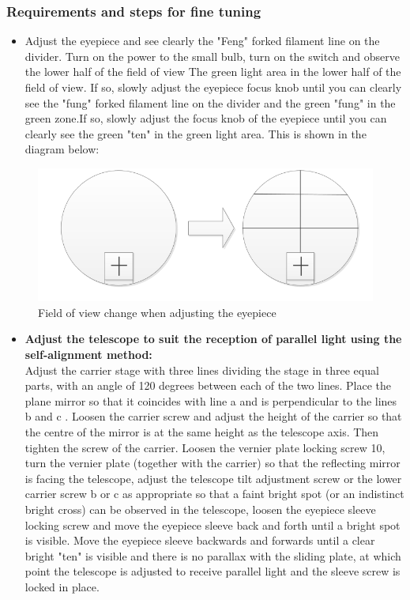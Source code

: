 \documentclass[UTF8]{article}
\begin{document}
    \subsubsection{Requirements and steps for fine tuning}
     \begin{itemize}
                 \item Adjust the eyepiece and see clearly the "Feng" forked filament line on the divider. Turn on the power to the small bulb, turn on the switch and observe the lower half of the field of view The green light area in the lower half of the field of view. If so, slowly adjust the eyepiece focus knob until you can clearly see the "fung" forked filament line on the divider and the green "fung" in the green zone.If so, slowly adjust the focus knob of the eyepiece until you can clearly see the green "ten" in the green light area. This is shown in the diagram below:
    \end{itemize}
     \begin{figure}[H]
         	\centering
         	\includegraphics[clip,scale=0.8,trim={0 0 0 0}]{fig/fig12.png}
         	\caption{Field of view change when adjusting the eyepiece}
         	\label{figure.12}
         	\end{figure} 
    \begin{itemize}
                     \item \textbf{Adjust the telescope to suit the reception of parallel light using the self-alignment method:} \\
                     Adjust the carrier stage with three lines dividing the stage in three equal parts, with an angle of 120 degrees between each of the two lines. Place the plane mirror so that it coincides with line a and is perpendicular to the lines b and c . Loosen the carrier screw and adjust the height of the carrier so that the centre of the mirror is at the same height as the telescope axis. Then tighten the screw of the carrier. Loosen the vernier plate locking screw 10, turn the vernier plate (together with the carrier) so that the reflecting mirror is facing the telescope, adjust the telescope tilt adjustment screw or the lower carrier screw b or c as appropriate so that a faint bright spot (or an indistinct bright cross) can be observed in the telescope, loosen the eyepiece sleeve locking screw and move the eyepiece sleeve back and forth until a bright spot is visible. Move the eyepiece sleeve backwards and forwards until a clear bright "ten" is visible and there is no parallax with the sliding plate, at which point the telescope is adjusted to receive parallel light and the sleeve screw is locked in place.
        \end{itemize} 
\end{document}

